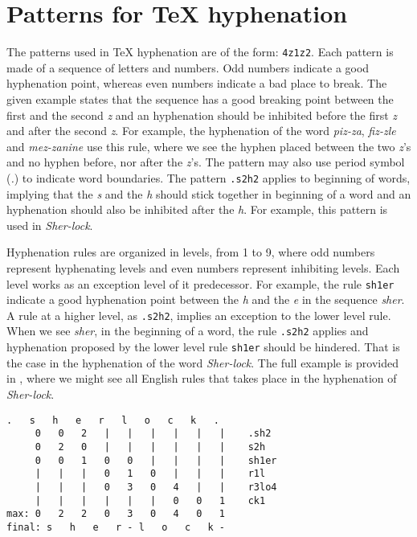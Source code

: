 \documentclass{article}
\begin{document}
\section{Patterns for \TeX{} hyphenation}\label{sec-patt4TeX} 
The patterns used in \TeX{} hyphenation are of the form: \texttt{4z1z2}. Each
pattern is made of a sequence of letters and numbers. Odd numbers indicate a
good hyphenation point, whereas even numbers indicate a bad place to break.
The given example states that the sequence has a good breaking point between
the first and the second \emph{z} and an hyphenation should be inhibited before
the first \emph{z} and after the second \emph{z}. For example, the hyphenation
of the word \emph{piz-za}, \emph{fiz-zle} and \emph{mez-zanine} use this rule,
where we see the hyphen placed between the two \emph{z}'s and no hyphen before,
nor after the \emph{z}'s. The pattern may also use period symbol (\emph{.}) to
indicate word boundaries. The pattern \texttt{.s2h2} applies to beginning of
words, implying that the \emph{s} and the \emph{h} should stick together in
beginning of a word and an hyphenation should also be inhibited after the
\emph{h}. For example, this pattern is used in \emph{Sher-lock}.

Hyphenation rules are organized in levels, from 1 to 9, where odd numbers
represent hyphenating levels and even numbers represent inhibiting levels. Each
level works as an exception level of it predecessor. For example, the rule
\texttt{sh1er} indicate a good hyphenation point between the \emph{h} and the
\emph{e} in the sequence \emph{sher}. A rule at a higher level, as
\texttt{.s2h2}, implies an exception to the lower level rule. When we see
\emph{sher}, in the beginning of a word, the rule \texttt{.s2h2} applies and
hyphenation proposed by the lower level rule \texttt{sh1er} should be hindered.
That is the case in the hyphenation of the word \emph{Sher-lock}. The full
example is provided in , where we might see all
English rules that takes place in the hyphenation of \emph{Sher-lock}.

\begin{lstlisting}[language={}, caption={Example of rules applyied in the
hyphenation of the word \emph{Sherlock}. Example done using a port of \TeX{}'s
hyphenation algorithm to Go provided at
\url{https://github.com/speedata/hyphenation}.}, label=sherlockhyphenation]
   .   s   h   e   r   l   o   c   k   .
     0   0   2   |   |   |   |   |   |    .sh2
     0   2   0   |   |   |   |   |   |    s2h
     0   0   1   0   0   |   |   |   |    sh1er
     |   |   |   0   1   0   |   |   |    r1l
     |   |   |   0   3   0   4   |   |    r3lo4
     |   |   |   |   |   |   0   0   1    ck1
max: 0   2   2   0   3   0   4   0   1
final: s   h   e   r - l   o   c   k -
\end{lstlisting}
\end{document}
